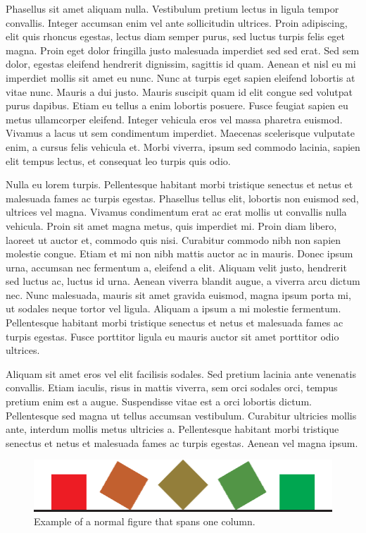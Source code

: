 \documentclass[submission]{gmp2015}
\begin{document}
Phasellus sit amet aliquam nulla. Vestibulum pretium lectus in ligula tempor convallis. Integer accumsan enim vel ante sollicitudin ultrices. Proin adipiscing, elit quis rhoncus egestas, lectus diam semper purus, sed luctus turpis felis eget magna. Proin eget dolor fringilla justo malesuada imperdiet sed sed erat. Sed sem dolor, egestas eleifend hendrerit dignissim, sagittis id quam. Aenean et nisl eu mi imperdiet mollis sit amet eu nunc. Nunc at turpis eget sapien eleifend lobortis at vitae nunc. Mauris a dui justo. Mauris suscipit quam id elit congue sed volutpat purus dapibus. Etiam eu tellus a enim lobortis posuere. Fusce feugiat sapien eu metus ullamcorper eleifend. Integer vehicula eros vel massa pharetra euismod. Vivamus a lacus ut sem condimentum imperdiet. Maecenas scelerisque vulputate enim, a cursus felis vehicula et. Morbi viverra, ipsum sed commodo lacinia, sapien elit tempus lectus, et consequat leo turpis quis odio.

Nulla eu lorem turpis. Pellentesque habitant morbi tristique senectus et netus et malesuada fames ac turpis egestas. Phasellus tellus elit, lobortis non euismod sed, ultrices vel magna. Vivamus condimentum erat ac erat mollis ut convallis nulla vehicula. Proin sit amet magna metus, quis imperdiet mi. Proin diam libero, laoreet ut auctor et, commodo quis nisi. Curabitur commodo nibh non sapien molestie congue. Etiam et mi non nibh mattis auctor ac in mauris. Donec ipsum urna, accumsan nec fermentum a, eleifend a elit. Aliquam velit justo, hendrerit sed luctus ac, luctus id urna. Aenean viverra blandit augue, a viverra arcu dictum nec. Nunc malesuada, mauris sit amet gravida euismod, magna ipsum porta mi, ut sodales neque tortor vel ligula. Aliquam a ipsum a mi molestie fermentum. Pellentesque habitant morbi tristique senectus et netus et malesuada fames ac turpis egestas. Fusce porttitor ligula eu mauris auctor sit amet porttitor odio ultrices.

Aliquam sit amet eros vel elit facilisis sodales. Sed pretium lacinia ante venenatis convallis. Etiam iaculis, risus in mattis viverra, sem orci sodales orci, tempus pretium enim est a augue. Suspendisse vitae est a orci lobortis dictum. Pellentesque sed magna ut tellus accumsan vestibulum. Curabitur ultricies mollis ante, interdum mollis metus ultricies a. Pellentesque habitant morbi tristique senectus et netus et malesuada fames ac turpis egestas. Aenean vel magna ipsum.

\begin{figure}\centering
  \includegraphics[scale=.5]{example}
  \caption{Example of a normal figure that spans one column.}
  \label{fig:square}
\end{figure}
\end{document}
